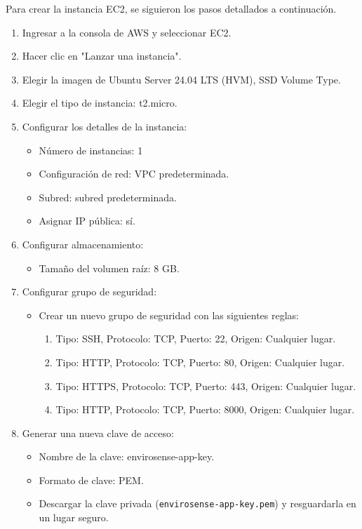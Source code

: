Para crear la instancia EC2, se siguieron los pasos detallados a continuación.

\begin{enumerate}
    \item Ingresar a la consola de AWS y seleccionar EC2.
    \item Hacer clic en "Lanzar una instancia".
    \item Elegir la imagen de Ubuntu Server 24.04 LTS (HVM), SSD Volume Type.
    \item Elegir el tipo de instancia: t2.micro.
    \item Configurar los detalles de la instancia:
          \begin{itemize}
              \item Número de instancias: 1
              \item Configuración de red: VPC predeterminada.
              \item Subred: subred predeterminada.
              \item Asignar IP pública: sí.
          \end{itemize}
    \item Configurar almacenamiento:
          \begin{itemize}
              \item Tamaño del volumen raíz: 8 GB.
          \end{itemize}
    \item Configurar grupo de seguridad:
          \begin{itemize}
              \item Crear un nuevo grupo de seguridad con las siguientes reglas:
                    \begin{enumerate}
                        \item Tipo: SSH, Protocolo: TCP, Puerto: 22, Origen: Cualquier lugar.
                        \item Tipo: HTTP, Protocolo: TCP, Puerto: 80, Origen: Cualquier lugar.
                        \item Tipo: HTTPS, Protocolo: TCP, Puerto: 443, Origen: Cualquier lugar.
                        \item Tipo: HTTP, Protocolo: TCP, Puerto: 8000, Origen: Cualquier lugar.
                    \end{enumerate}
          \end{itemize}
    \item Generar una nueva clave de acceso:
          \begin{itemize}
              \item Nombre de la clave: envirosense-app-key.
              \item Formato de clave: PEM.
              \item Descargar la clave privada (\texttt{envirosense-app-key.pem}) y resguardarla en
                    un lugar seguro.
          \end{itemize}
\end{enumerate}

